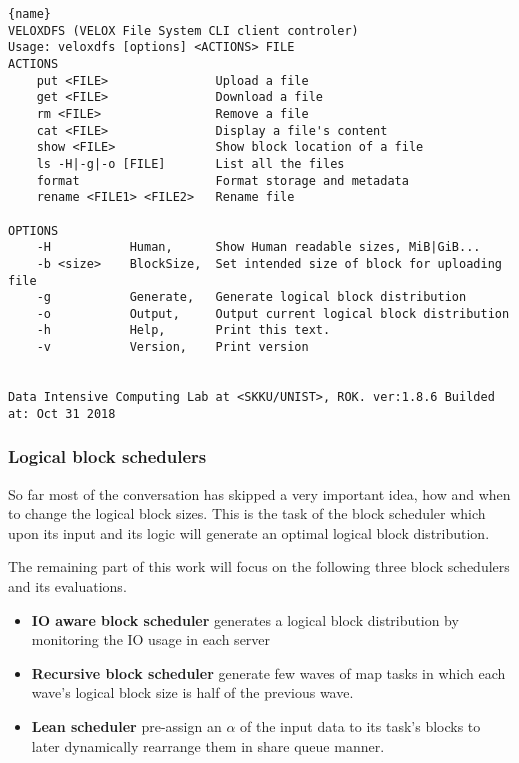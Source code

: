 \begin{lstlisting}[caption=extracted from veloxdfs --help, label={lst:cli}, frame=tb]{name}
VELOXDFS (VELOX File System CLI client controler)
Usage: veloxdfs [options] <ACTIONS> FILE
ACTIONS
    put <FILE>               Upload a file
    get <FILE>               Download a file
    rm <FILE>                Remove a file
    cat <FILE>               Display a file's content
    show <FILE>              Show block location of a file
    ls -H|-g|-o [FILE]       List all the files
    format                   Format storage and metadata
    rename <FILE1> <FILE2>   Rename file 
  
OPTIONS
    -H           Human,      Show Human readable sizes, MiB|GiB...
    -b <size>    BlockSize,  Set intended size of block for uploading file
    -g           Generate,   Generate logical block distribution
    -o           Output,     Output current logical block distribution
    -h           Help,       Print this text.
    -v           Version,    Print version


Data Intensive Computing Lab at <SKKU/UNIST>, ROK. ver:1.8.6 Builded at: Oct 31 2018
\end{lstlisting}

\subsubsection{Logical block schedulers}
So far most of the conversation has skipped a very important idea, how and when to change the logical block sizes. This is the task of the block scheduler which upon its input and its logic will generate an optimal logical block distribution.

The remaining part of this work will focus on the following three block schedulers and its evaluations. 
\begin{itemize}
    \item \textbf{IO aware block scheduler} generates a logical block distribution by monitoring the IO usage in each server
    \item \textbf{Recursive block scheduler} generate few waves of map tasks in which each wave's logical block size is half of the previous wave.
    \item \textbf{Lean scheduler} pre-assign an $\alpha$ of the input data to its task's blocks to later dynamically rearrange them in share queue manner.
\end{itemize}


